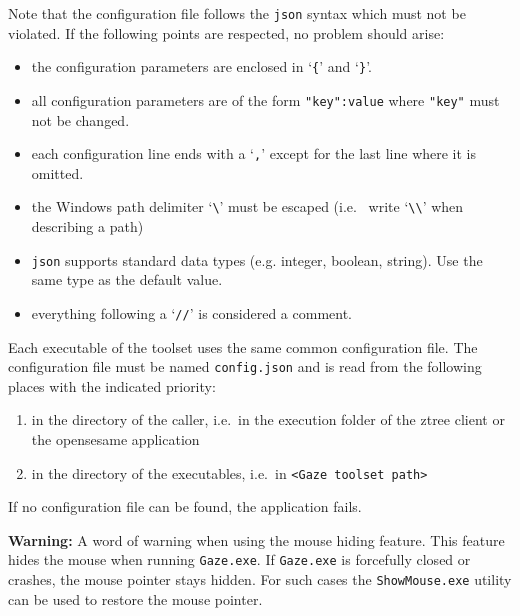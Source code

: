 \documentclass[a4paper,oneside]{book}
\begin{document}


Note that the configuration file follows the \texttt{json} syntax which must not be violated.
If the following points are respected, no problem should arise:
\begin{itemize}
    \item the configuration parameters are enclosed in `\texttt{\{}' and `\texttt{\}}'.
    \item all configuration parameters are of the form \texttt{"key":value} where \texttt{"key"} must not be changed.
    \item each configuration line ends with a `\texttt{,}' except for the last line where it is omitted.
    \item the Windows path delimiter `\texttt{\textbackslash}' must be escaped (i.e.~ write `\texttt{\textbackslash\textbackslash}' when describing a path)
    \item \texttt{json} supports standard data types (e.g. integer, boolean, string).
        Use the same type as the default value.
    \item everything following a `\texttt{//}' is considered a comment.
\end{itemize}

Each executable of the toolset uses the same common configuration file.
The configuration file must be named \texttt{config.json} and is read from the following places with the indicated priority:
\begin{enumerate}
    \item in the directory of the caller, i.e.~in the execution folder of the ztree client or the opensesame application
    \item in the directory of the executables, i.e.~in \texttt{<Gaze toolset path>}
\end{enumerate}
If no configuration file can be found, the application fails.

\begin{mdframed}[backgroundcolor=boxbkg]\textbf{\color{red}Warning:}
    A word of warning when using the mouse hiding feature.
    This feature hides the mouse when running \texttt{Gaze.exe}.
    If \texttt{Gaze.exe} is forcefully closed or crashes, the mouse pointer stays hidden.
    For such cases the \texttt{ShowMouse.exe} utility can be used to restore the mouse pointer.
\end{mdframed}

\end{document}
